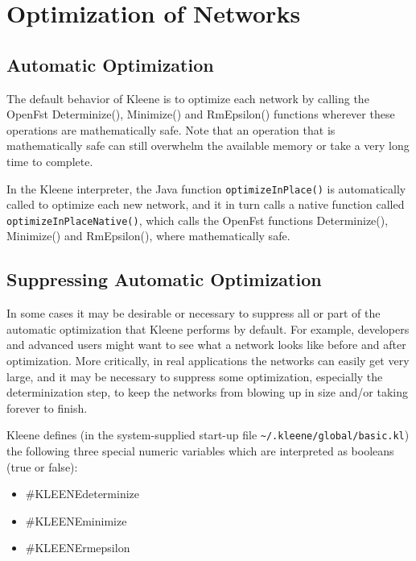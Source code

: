 \chapter{Optimization of Networks}

\label{app:optimize}

\section{Automatic Optimization}

The default behavior of Kleene is to optimize each network by calling
the OpenFst Determinize(), Minimize() and RmEpsilon() functions wherever
these operations are mathematically safe.  Note that an operation that is
mathematically safe can still overwhelm the available memory or
take a very long time to complete.

In the Kleene interpreter, the Java function \texttt{optimizeInPlace()}
is automatically called to optimize each new network, and it in turn
calls a native \CPP{} function called \texttt{optimizeInPlaceNative()},
which calls the OpenFst functions 
Determinize(), Minimize() and RmEpsilon(), where
mathematically safe.

\section{Suppressing Automatic Optimization}

In some cases it may be desirable or necessary to suppress all or part of
the automatic optimization that Kleene performs by default.  For example,
developers and advanced users might want to see what a network looks like
before and after optimization.  More critically, in real applications the
networks can easily get very large, and it may be necessary to suppress
some optimization, especially the determinization step, to keep the
networks from blowing up in size and/or taking forever to finish.

Kleene defines (in the system-supplied 
start-up file \verb!~/.kleene/global/basic.kl!) the following three
special numeric variables which are interpreted as booleans (true or
false):

\begin{itemize}
\item
\#KLEENEdeterminize
\item
\#KLEENEminimize
\item
\#KLEENErmepsilon
\end{itemize}

